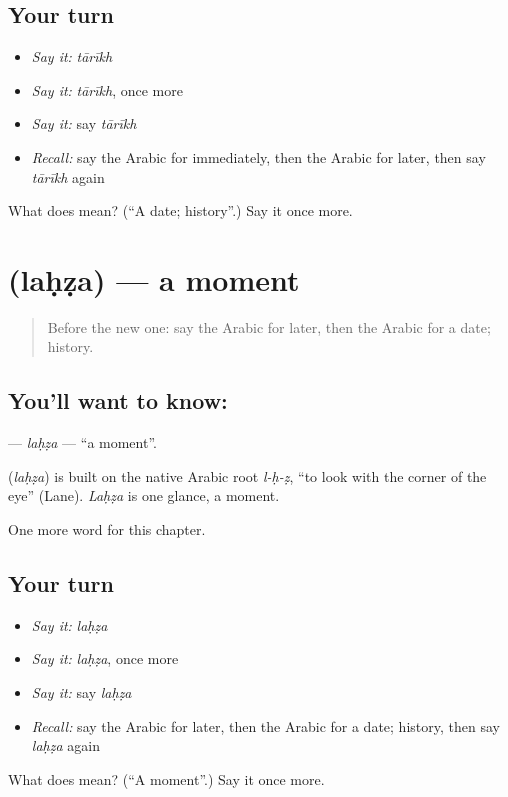 \subsection*{Your turn}
\begin{itemize}
\raggedright
  \item \emph{Say it:} \emph{tārīkh}
  \item \emph{Say it:} \emph{tārīkh}, once more
  \item \emph{Say it:} say \emph{tārīkh}
  \item \emph{Recall:} say the Arabic for immediately, then the Arabic for later, then say \emph{tārīkh} again
\end{itemize}

\begin{tcolorbox}[breakable,colback=teal!4,colframe=teal!35!black,title={Before you move on}]
What does  mean? (\textquotedblleft{}A date; history\textquotedblright{}.) Say it once more.
\end{tcolorbox}
\section[\texorpdfstring{\ar{لحظة} (laḥẓa)}{لحظة (laḥẓa)}]{ (laḥẓa) — a moment}

\label{lesson:AR-C202-lahza}



\begin{quote}
Before the new one: say the Arabic for later, then the Arabic for a date; history.
\end{quote}

\subsection*{You'll want to know: }
\textbf{} — \emph{laḥẓa} — \textquotedblleft{}a moment\textquotedblright{}.

\begin{cousinweb}
\textbf{} (\emph{laḥẓa}) is built on the native Arabic root \emph{l-ḥ-ẓ}, \textquotedblleft{}to look with the corner of the eye\textquotedblright{} (Lane). \emph{Laḥẓa} is one glance, a moment.
\end{cousinweb}

\begin{grammarlens}[title={What you've built}]
One more word for this chapter.
\end{grammarlens}

\subsection*{Your turn}
\begin{itemize}
\raggedright
  \item \emph{Say it:} \emph{laḥẓa}
  \item \emph{Say it:} \emph{laḥẓa}, once more
  \item \emph{Say it:} say \emph{laḥẓa}
  \item \emph{Recall:} say the Arabic for later, then the Arabic for a date; history, then say \emph{laḥẓa} again
\end{itemize}

\begin{tcolorbox}[breakable,colback=teal!4,colframe=teal!35!black,title={Before you move on}]
What does  mean? (\textquotedblleft{}A moment\textquotedblright{}.) Say it once more.
\end{tcolorbox}
